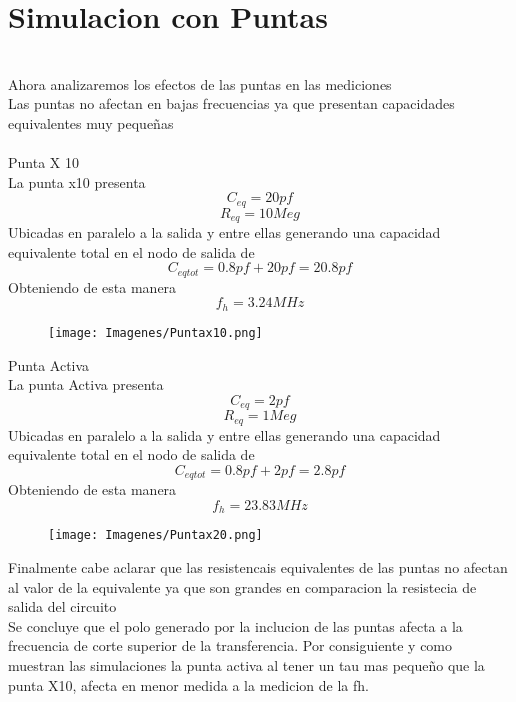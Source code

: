 \documentclass[a4paper,10pt]{article}
\begin{document}
			\chapter{Simulacion con Puntas}
				\\Ahora analizaremos los efectos de las puntas en las mediciones\\
				Las puntas no afectan en bajas frecuencias ya que presentan capacidades equivalentes muy pequeñas\\\\
				Punta X 10\\
				La punta x10 presenta
				\begin{displaymath}
					C_{eq} = 20 pf
				\end{displaymath}
				\begin{displaymath}
					R_{eq} = 10 Meg
				\end{displaymath}
				Ubicadas en paralelo a la salida y entre ellas generando una capacidad equivalente total en el nodo de salida de
				\begin{displaymath}
					C_{eqtot}= 0.8pf+20pf = 20.8 pf
				\end{displaymath}
				Obteniendo de esta manera
				\begin{displaymath}
					f_h = 3.24 MHz
				\end{displaymath}
				\begin{figure}[!htb]
					\centering
						\texttt{[image: Imagenes/Puntax10.png]}
				\end{figure}
				Punta Activa\\
				La punta Activa presenta
				\begin{displaymath}
					C_{eq} = 2 pf
				\end{displaymath}
				\begin{displaymath}
					R_{eq} = 1 Meg
				\end{displaymath}
				Ubicadas en paralelo a la salida y entre ellas generando una capacidad equivalente total en el nodo de salida de 
				\begin{displaymath}
					C_{eqtot}= 0.8pf+2pf = 2.8 pf
				\end{displaymath}
				Obteniendo de esta manera
				\begin{displaymath}
					f_h = 23.83 MHz
				\end{displaymath}
				\begin{figure}[!htb]
					\centering
						\texttt{[image: Imagenes/Puntax20.png]}
				\end{figure}
				Finalmente cabe aclarar que las resistencais equivalentes de las puntas no afectan al valor de la equivalente ya que son grandes en comparacion 
				la resistecia de salida del circuito\\
				Se concluye que el polo generado por la inclucion de las puntas afecta a la frecuencia de corte superior de la transferencia. Por consiguiente y 
				como muestran las simulaciones la punta activa al tener un tau mas pequeño que la punta X10, afecta en menor medida a la medicion de la fh.
			
\end{document}
